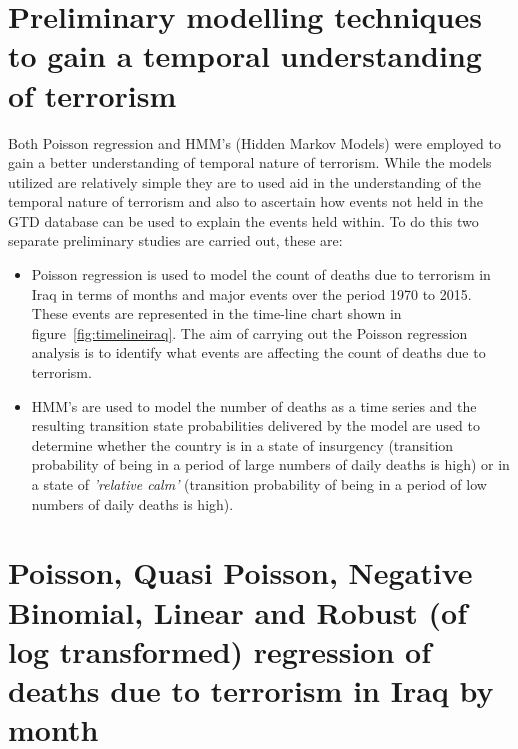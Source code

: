 \section{Preliminary modelling techniques to gain a temporal understanding of terrorism}
Both Poisson regression and HMM's (Hidden Markov Models) were employed to gain a better understanding of temporal nature of terrorism. While the models utilized are relatively simple they are to used aid in the understanding of the temporal nature of terrorism and also to ascertain how events not held in the GTD database can be used to explain the events held within. To do this two separate preliminary studies are carried out, these are:
\begin{itemize}
\item Poisson regression is used to model the count of deaths due to terrorism in Iraq in terms of months and major events over the period 1970 to 2015. These events are  represented in the time-line chart shown in figure~\ref{fig:timelineiraq}. The aim of carrying out the Poisson regression analysis is to identify what events are affecting the count of deaths due to terrorism. 
\item HMM's are used to model the number of deaths as a time series and the resulting transition state probabilities delivered by the model are used to determine whether the country is in a state of insurgency (transition probability of being in a period of large numbers of daily deaths is high) or in a state of \textit{'relative calm'}  (transition probability of being in a period of low numbers of daily deaths is high).
\end{itemize}

\section{Poisson, Quasi Poisson, Negative Binomial, Linear  and Robust (of log transformed)  regression of deaths due to terrorism in Iraq by month}

